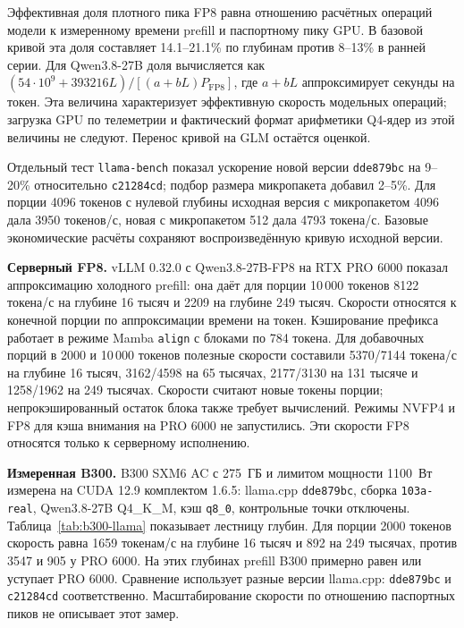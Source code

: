 Эффективная доля плотного пика FP8 равна отношению расчётных операций модели к измеренному
времени prefill и паспортному пику GPU. В базовой кривой эта доля составляет 14.1--21.1\%
по глубинам против 8--13\% в ранней серии. Для Qwen3.8-27B доля вычисляется как
$(54\cdot10^9 + 393216L)/[(a+bL)P_{\mathrm{FP8}}]$, где $a+bL$ аппроксимирует секунды на токен.
Эта величина характеризует эффективную скорость модельных операций; загрузка GPU по телеметрии
и фактический формат арифметики Q4-ядер из этой величины не следуют.
Перенос кривой на GLM остаётся оценкой.

Отдельный тест \texttt{llama-bench} показал ускорение новой версии \texttt{dde879bc} на 9--20\%
относительно \texttt{c21284cd}; подбор размера микропакета добавил 2--5\%.
Для порции 4096 токенов с нулевой глубины исходная версия с микропакетом 4096 дала 3950 токенов/с,
новая с микропакетом 512 дала 4793 токена/с. Базовые экономические расчёты сохраняют
воспроизведённую кривую исходной версии.

\textbf{Серверный FP8.} vLLM 0.32.0 с Qwen3.8-27B-FP8 на RTX PRO 6000 показал
аппроксимацию холодного prefill: она даёт для порции 10\,000 токенов 8122 токена/с на глубине 16 тысяч
и 2209 на глубине 249 тысяч. Скорости относятся к конечной порции по аппроксимации времени на токен.
Кэширование префикса работает в режиме Mamba \texttt{align} с блоками по 784 токена.
Для добавочных порций в 2000 и 10\,000 токенов полезные скорости составили 5370/7144 токена/с
на глубине 16 тысяч, 3162/4598 на 65 тысячах, 2177/3130 на 131 тысяче и 1258/1962 на 249 тысячах.
Скорости считают новые токены порции; непрокэшированный остаток блока также требует вычислений.
Режимы NVFP4 и FP8 для кэша внимания на PRO 6000 не запустились.
Эти скорости FP8 относятся только к серверному исполнению.

\textbf{Измеренная B300.} B300 SXM6 AC с 275~ГБ и лимитом мощности 1100~Вт измерена на CUDA 12.9
комплектом 1.6.5: llama.cpp \texttt{dde879bc}, сборка \texttt{103a-real}, Qwen3.8-27B Q4\_K\_M,
кэш \texttt{q8\_0}, контрольные точки отключены. Таблица~\ref{tab:b300-llama} показывает лестницу глубин.
Для порции 2000 токенов скорость равна 1659 токенам/с на глубине 16 тысяч и 892 на 249 тысячах,
против 3547 и 905 у PRO 6000. На этих глубинах prefill B300 примерно равен или уступает PRO 6000.
Сравнение использует разные версии llama.cpp: \texttt{dde879bc} и \texttt{c21284cd} соответственно.
Масштабирование скорости по отношению паспортных пиков не описывает этот замер.


